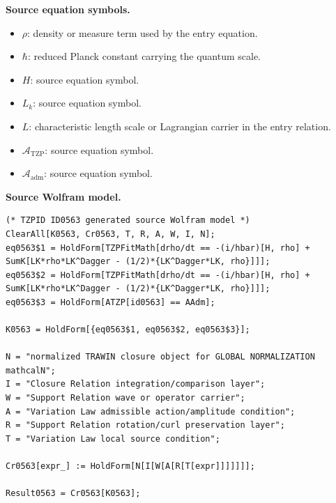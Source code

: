 \begin{minipage}[t]{0.49\linewidth}
\begingroup
\small
\raggedright
\textbf{Source equation symbols.}\par
\begin{itemize}[leftmargin=1.35em,itemsep=1pt,topsep=1pt,parsep=0pt]
    \item $\rho$: density or measure term used by the entry equation.
    \item $\hbar$: reduced Planck constant carrying the quantum scale.
    \item $H$: source equation symbol.
    \item $L_k$: source equation symbol.
    \item $L$: characteristic length scale or Lagrangian carrier in the entry relation.
    \item $\mathcal{A}_{\mathrm{TZP}}$: source equation symbol.
    \item $\mathcal{A}_{\mathrm{adm}}$: source equation symbol.
\end{itemize}
\endgroup
\end{minipage}\hfill
\begin{minipage}[t]{0.47\linewidth}
\begingroup
\scriptsize
\raggedright
\textbf{Source Wolfram model.}\par
\begin{Verbatim}[fontsize=\tiny,breaklines=true,breakanywhere=true]
(* TZPID ID0563 generated source Wolfram model *)
ClearAll[K0563, Cr0563, T, R, A, W, I, N];
eq0563$1 = HoldForm[TZPFitMath[drho/dt == -(i/hbar)[H, rho] + SumK[LK*rho*LK^Dagger - (1/2)*{LK^Dagger*LK, rho}]]];
eq0563$2 = HoldForm[TZPFitMath[drho/dt == -(i/hbar)[H, rho] + SumK[LK*rho*LK^Dagger - (1/2)*{LK^Dagger*LK, rho}]]];
eq0563$3 = HoldForm[ATZP[id0563] == AAdm];

K0563 = HoldForm[{eq0563$1, eq0563$2, eq0563$3}];

N = "normalized TRAWIN closure object for GLOBAL NORMALIZATION mathcalN";
I = "Closure Relation integration/comparison layer";
W = "Support Relation wave or operator carrier";
A = "Variation Law admissible action/amplitude condition";
R = "Support Relation rotation/curl preservation layer";
T = "Variation Law local source condition";

Cr0563[expr_] := HoldForm[N[I[W[A[R[T[expr]]]]]]];

Result0563 = Cr0563[K0563];
\end{Verbatim}
\endgroup
\end{minipage}


